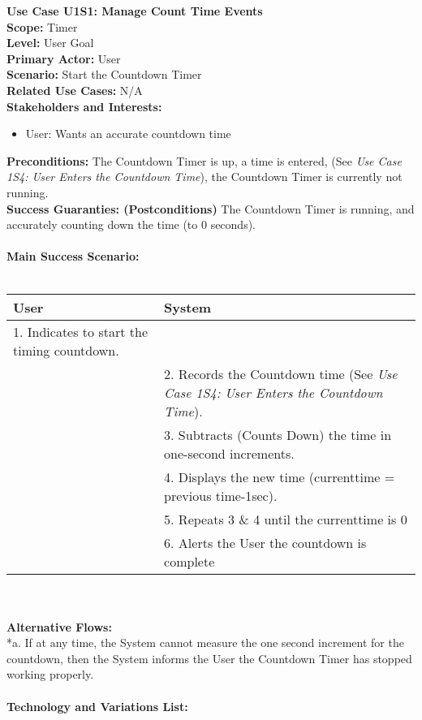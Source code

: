 \documentclass[letterpaper]{article}
\begin{document}
\noindent
\textbf{Use Case U1S1:  Manage Count Time Events}\\
\textbf{Scope:  }Timer\\
\textbf{Level:  }User Goal\\
\textbf{Primary Actor:  }User\\
\textbf{Scenario:  }Start the Countdown Timer\\
\textbf{Related Use Cases:  }N/A\\
\textbf{Stakeholders and Interests:}
\begin{itemize}
\item User:  Wants an accurate countdown time
\end{itemize}
\textbf{Preconditions:  }The Countdown Timer is up, a time is entered,
(See \emph{Use Case 1S4: User Enters the Countdown Time}), the Countdown Timer
is currently not running.\\
\textbf{Success Guaranties:  (Postconditions)} 
The Countdown Timer is running, and accurately counting down the time
(to 0 seconds).\\\\
\textbf{Main Success Scenario: }\\\\
\begin{tabular}{|p{6cm}|p{6cm}|}\hline
\textbf{User} & \textbf{System}\\\hline
1.  Indicates to start the timing countdown. & \\\hline
&2.  Records the Countdown time (See \textit{Use Case 1S4:  User Enters the 
Countdown Time}).\\\hline
&3.  Subtracts (Counts Down) the time in one-second increments.\\\hline
&4.  Displays the new time (currenttime = previous time-1sec).\\\hline
&5. Repeats 3 \& 4 until the currenttime is 0\\\hline
&6. Alerts the User the countdown is complete\\\hline
\end{tabular}\\\\
\textbf{Alternative Flows:  }\\
*a.  If at any time, the System cannot measure the one second increment
for the countdown, then the System informs the User the Countdown Timer
has stopped working properly.\\\\
\textbf{Technology and Variations List:  }\\
\end{document}
